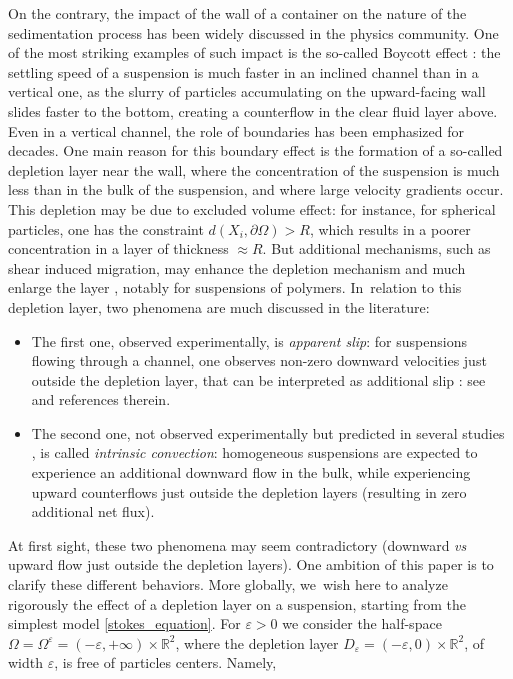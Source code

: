 \documentclass[10pt]{amsart}
\theoremstyle{plain}
\theoremstyle{definition}
\let\pa\partial
\let\eps\varepsilon
\newcommand{\R}{\mathbb{R}}
\begin{document}
On the contrary, the impact of the wall of a container on the nature of the sedimentation process has been widely discussed in the physics community. One of the most striking examples of such impact is the so-called Boycott effect \cite{Boy20}: the settling speed of a suspension is much faster in an inclined channel than in a vertical one, as the slurry of particles accumulating on the upward-facing wall slides faster to the bottom, creating a counterflow in the clear fluid layer above.
Even in a vertical channel, the role of boundaries has been emphasized for decades. One main reason for this boundary effect is the formation of a so-called depletion layer near the wall, where the concentration of the suspension is much less than in the bulk of the suspension, and where large velocity gradients occur. This depletion may be due to excluded volume effect: for instance, for spherical particles, one has the constraint $d(X_i, \pa \Omega) > R$, which results in a poorer concentration in a layer of thickness $\approx R$. But additional mechanisms, such as shear induced migration, may enhance the depletion mechanism and much enlarge the layer \cite{SegSil,SegSil2,Ho_Leal_1974,Ausserre}, notably for suspensions of polymers. In~relation to this depletion layer, two phenomena are much discussed in the literature:
\begin{itemize}
\item The first one, observed experimentally, is {\em apparent slip}: for suspensions flowing through a channel, one observes non-zero downward velocities just outside the depletion layer, that can be interpreted as additional slip : see \cite{Abbasi,Koponen,Ghosh} and references therein.
\item The second one, not observed experimentally but predicted in several studies \cite{GeiMaz,BFAH96,BFBA98}, is called {\em intrinsic convection}: homogeneous suspensions are expected to experience an additional downward flow in the bulk, while experiencing upward counterflows just outside the depletion layers (resulting in zero additional net flux).
\end{itemize}
At first sight, these two phenomena may seem contradictory (downward {\it vs} upward flow just outside the depletion layers). One ambition of this paper is to clarify these different behaviors. More globally, we~wish here to analyze rigorously the effect of a depletion layer on a suspension, starting from the simplest model \eqref{stokes_equation}. For $\eps > 0$ we consider the half-space $\Omega = \Omega^\eps = (-\eps,+\infty) \times \R^2$, where the depletion layer $D_\eps = (-\eps,0) \times \R^2$, of width $\eps$, is free of particles centers. Namely,
\end{document}
